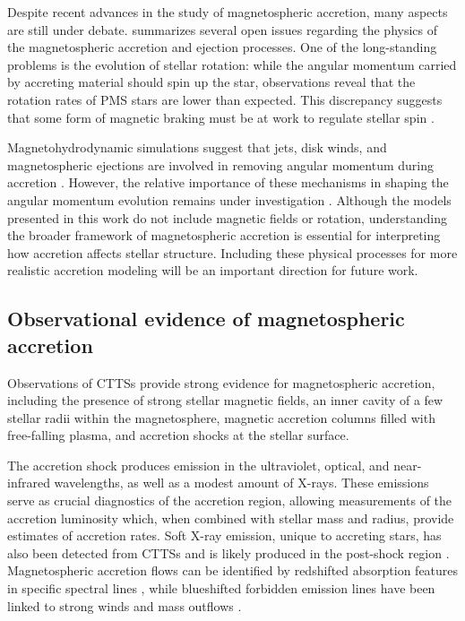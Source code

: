 \documentclass[12pt,a4paper]{article}
\begin{document}
Despite recent advances in the study of magnetospheric accretion, many aspects are still under debate. \textcite{Bouvier2014} summarizes several open issues regarding the physics of the magnetospheric accretion and ejection processes. One of the long-standing problems is the evolution of stellar rotation: while the angular momentum carried by accreting material should spin up the star, observations reveal that the rotation rates of PMS stars are lower than expected. This discrepancy suggests that some form of magnetic braking must be at work to regulate stellar spin \parencite[e.g.,][]{HerbstEtAl2007}.

Magnetohydrodynamic simulations suggest that jets, disk winds, and magnetospheric ejections are involved in removing angular momentum during accretion \parencite[e.g.,][]{RomanovaEtAl2004,LiiEtAl2014,IrelandEtAl2020}. However, the relative importance of these mechanisms in shaping the angular momentum evolution remains under investigation \parencite[e.g.,][]{KunitomoEtAl2017}. Although the models presented in this work do not include magnetic fields or rotation, understanding the broader framework of magnetospheric accretion is essential for interpreting how accretion affects stellar structure. Including these physical processes for more realistic accretion modeling will be an important direction for future work.

\subsection{Observational evidence of magnetospheric accretion}
\label{sec:obs_evidence}

Observations of CTTSs provide strong evidence for magnetospheric accretion, including the presence of strong stellar magnetic fields, an inner cavity of a few stellar radii within the magnetosphere, magnetic accretion columns filled with free-falling plasma, and accretion shocks at the stellar surface.

The accretion shock produces emission in the ultraviolet, optical, and near-infrared wavelengths, as well as a modest amount of X-rays. These emissions serve as crucial diagnostics of the accretion region, allowing measurements of the accretion luminosity which, when combined with stellar mass and radius, provide estimates of accretion rates. Soft X-ray emission, unique to accreting stars, has also been detected from CTTSs and is likely produced in the post-shock region \parencite[e.g.,][]{KastnerEtAl2002}. Magnetospheric accretion flows can be identified by redshifted absorption features in specific spectral lines \parencite{MuzerolleEtAl2001}, while blueshifted forbidden emission lines have been linked to strong winds and mass outflows \parencite[e.g.,][]{Bally2016}.
\end{document}
